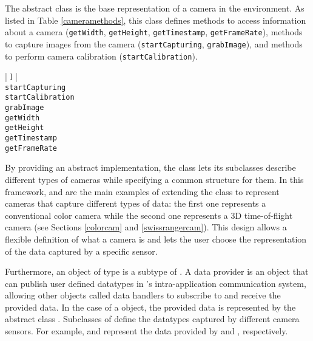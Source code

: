 The \Camera{} abstract class is the base representation of a camera in the \RD{} environment.  As listed in 
Table \ref{cameramethods}, this class defines methods to access information about a camera 
(\texttt{get\-Width}, \texttt{get\-Height}, \texttt{get\-Time\-stamp}, \texttt{get\-Frame\-Rate}), methods to capture 
images from the camera (\texttt{start\-Cap\-turing}, \texttt{grab\-Im\-age}), and methods to perform camera 
calibration (\texttt{start\-Cal\-i\-bra\-tion}). 

\begin{table}[ht]
\caption{Public methods in the \Camera{} class}
\begin{center}
\begin{tabular}{| l |}
	\hline 
	 \\
	\hline \hline
	\texttt{startCapturing} \\
	\texttt{startCalibration} \\
	\texttt{grabImage}	\\
	\texttt{getWidth} \\
	\texttt{getHeight} \\
	\texttt{getTimestamp} \\
	\texttt{getFrameRate} \\
	\hline
\end{tabular}
\end{center}
\label{cameramethods}
\end{table}

By providing an abstract implementation, the \Camera{} class lets its subclasses describe different types of 
cameras while specifying a common structure for them.  In this framework, \ColorCam{} and 
\SwissRangerCam{} are the main examples of extending the \Camera{} class to represent 
cameras that capture different types of data: the first one represents a conventional color camera while 
the second one represents a 3D time-of-flight camera (see Sections \ref{colorcam} and \ref{swissrangercam}). 
This design allows a flexible definition of what a camera is and lets the user choose the representation 
of the data captured by a specific sensor.

Furthermore, an object of type \Camera{} is a subtype of \DataProvider{}. A data provider is an object that 
can publish user defined datatypes in \RD{}'s  intra-application communication system, allowing other objects 
called data handlers to subscribe to and receive the provided data. In the case of a \Camera{} object, 
the provided data is represented by the abstract class \CameraData{}. Subclasses of \CameraData{}
define the datatypes captured by different camera sensors. For example, \ColorCamData{} and 
\SwissRangerCamData{} represent the data provided by \ColorCam{} and \SwissRangerCam{}, respectively.
